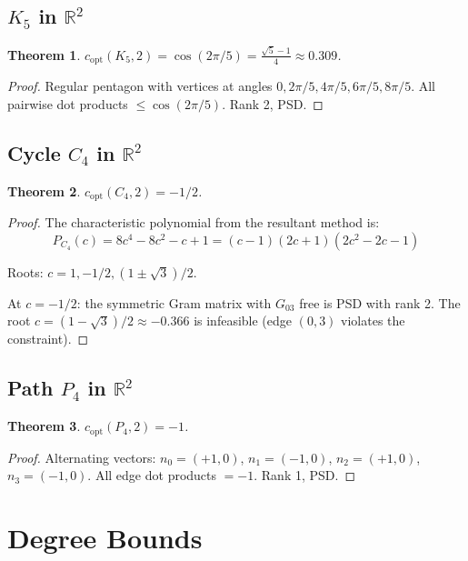 \documentclass[11pt]{article}
\newtheorem{theorem}{Theorem}[section]
\theoremstyle{definition}
\begin{document}
\subsection{$K_5$ in $\mathbb{R}^2$}

\begin{theorem}
$c_{\mathrm{opt}}(K_5, 2) = \cos(2\pi/5) = \frac{\sqrt{5}-1}{4} \approx 0.309$.
\end{theorem}

\begin{proof}
Regular pentagon with vertices at angles $0, 2\pi/5, 4\pi/5, 6\pi/5, 8\pi/5$.
All pairwise dot products $\le \cos(2\pi/5)$. Rank 2, PSD.
\end{proof}

\subsection{Cycle $C_4$ in $\mathbb{R}^2$}

\begin{theorem}
$c_{\mathrm{opt}}(C_4, 2) = -1/2$.
\end{theorem}

\begin{proof}
The characteristic polynomial from the resultant method is:
\begin{equation}
P_{C_4}(c) = 8c^4 - 8c^2 - c + 1 = (c-1)(2c+1)(2c^2 - 2c - 1)
\end{equation}

Roots: $c = 1, -1/2, (1 \pm \sqrt{3})/2$.

At $c = -1/2$: the symmetric Gram matrix with $G_{03}$ free is PSD with
rank 2. The root $c = (1-\sqrt{3})/2 \approx -0.366$ is infeasible
(edge $(0,3)$ violates the constraint).
\end{proof}

\subsection{Path $P_4$ in $\mathbb{R}^2$}

\begin{theorem}
$c_{\mathrm{opt}}(P_4, 2) = -1$.
\end{theorem}

\begin{proof}
Alternating vectors: $n_0 = (+1, 0)$, $n_1 = (-1, 0)$, $n_2 = (+1, 0)$,
$n_3 = (-1, 0)$. All edge dot products $= -1$. Rank 1, PSD.
\end{proof}

\section{Degree Bounds}
\end{document}
